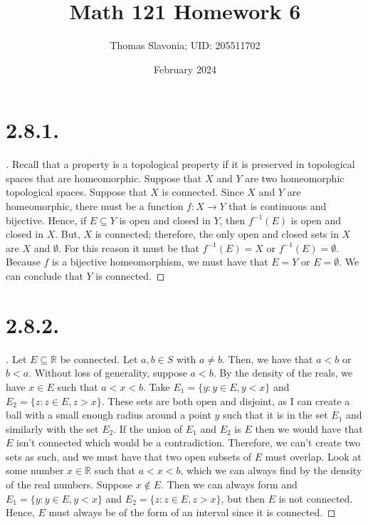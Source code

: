 \documentclass{article}
\title{Math 121 Homework 6}
\author{Thomas Slavonia; UID: 205511702}
\date{February 2024}
\begin{document}
\maketitle
\section*{2.8.1.}
\begin{proof}[\unskip\nopunct]
Recall that a property is a topological property if it is preserved in topological spaces that are homeomorphic. Suppose that $X$ and $Y$ are two homeomorphic topological spaces. Suppose that $X$ is connected. Since $X$ and $Y$ are homeomorphic, 
there must be a function $f: X \rightarrow Y$ that is continuous and bijective. Hence, if $E \subseteq Y$ is open and closed in $Y$, then $f^{-1}(E)$ is 
open and closed in $X$. But, $X$ is connected; therefore, the only open and closed sets in $X$ are $X$ and $\emptyset$. For this reason it must be that $f^{-1}(E) = X$ or $f^{-1}(E) = \emptyset$. Because $f$ is a bijective homeomorphism, we must have that $E = Y$ or $E = \emptyset$. We can conclude that $Y$  is connected. 
\end{proof}

\section*{2.8.2.}
\begin{proof}[\unskip\nopunct]
Let $E \subseteq \mathbb{R}$ be connected. Let $a, b \in S$ with $a \neq b$. Then, we have that $a < b$ or $b < a$. Without loss of generality, suppose $a < b$. By the density of the reals, we have $x \in E$ such that $a < x < b$. Take $E_1 = \{y: y \in E, y < x \}$ and $E_2 = \{z: z \in E, z > x\}$. These sets are both open and disjoint, as I can create a ball with a small enough radius around a point $y$ such that it is in the set $E_1$ and similarly with the set $E_2$. If the union of $E_1$ and $E_2$ is $E$ then we would have that $E$ isn't connected which would be a contradiction. 
Therefore, we can't create two sets as such, and we must have that two open subsets of $E$ must overlap. Look at some number $x \in \mathbb{R}$ such that $a < x < b$, which we can always find by the density of the real numbers. Suppose $x \notin E$. Then we can always form and $E_1 = \{y: y \in E, y < x \}$ and $E_2 = \{z: z \in E, z > x\}$, but then $E$ is not connected. Hence, $E$ must always be of the form of an interval since it is connected. 
\end{proof}
\end{document}
